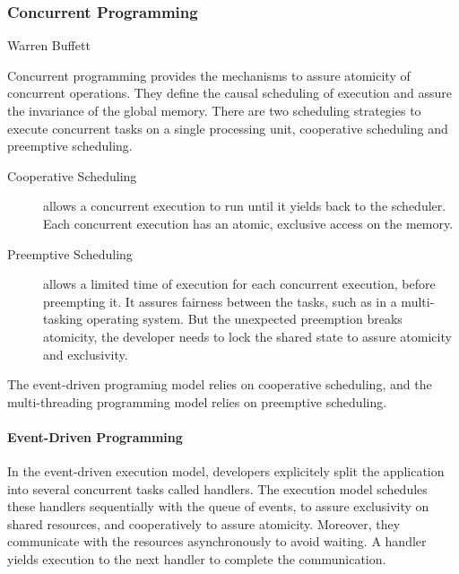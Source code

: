 \subsubsection{Concurrent Programming} \label{chapter3:software-efficiency:concurrency:concurrent-programming}


{Warren Buffett}

Concurrent programming provides the mechanisms to assure atomicity of concurrent operations.
They define the causal scheduling of execution and assure the invariance of the global memory.
There are two scheduling strategies to execute concurrent tasks on a single processing unit, cooperative scheduling and preemptive scheduling.

\begin{description}
\item[Cooperative Scheduling] allows a concurrent execution to run until it yields back to the scheduler.
Each concurrent execution has an atomic, exclusive access on the memory.
\item[Preemptive Scheduling] allows a limited time of execution for each concurrent execution, before preempting it.
It assures fairness between the tasks, such as in a multi-tasking operating system.
But the unexpected preemption breaks atomicity, the developer needs to lock the shared state to assure atomicity and exclusivity.
\end{description}

The event-driven programing model relies on cooperative scheduling, and the multi-threading programming model relies on preemptive scheduling.

\paragraph{Event-Driven Programming}

In the event-driven execution model, developers explicitely split the application into several concurrent tasks called handlers.
The execution model schedules these handlers sequentially with the queue of events, to assure exclusivity on shared resources, and cooperatively to assure atomicity.
Moreover, they communicate with the resources asynchronously to avoid waiting.
A handler yields execution to the next handler to complete the communication.

